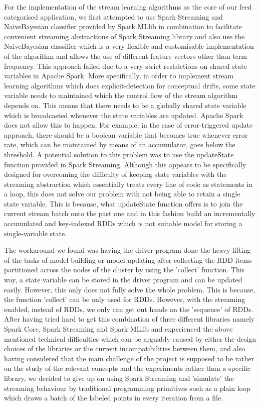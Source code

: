 \documentclass{article} %
\begin{document}
For the implementation of the stream learning algorithms as the core of our feed categorised application, we first attempted to use Spark Streaming and NaiveBayesian classifier provided by Spark MLlib in combination to facilitate convenient streaming abstractions of Spark Streaming library and also use the NaiveBayesian classifier which is a very flexible and customisable implementation of the algorithm and allows the use of different feature vectors other than term-frequency. This approach failed due to a very strict restrictions on shared state variables in Apache Spark. More specifically, in order to implement stream learning algorithms which does explicit-detection for conceptual drifts, some state variable needs to maintained which the control flow of the stream algorithm depends on. This means that there needs to be a globally shared state variable which is broadcasted whenever the state variables are updated. Apache Spark does not allow this to happen. For example, in the case of error-triggered update approach, there should be a boolean variable that becomes true whenever error rate, which can be maintained by means of an accumulator, goes below the threshold. A potential solution to this problem was to use the updateState function provided in Spark Streaming. Although this appears to be specifically designed for overcoming the difficulty of keeping state variables with the streaming abstraction which essentially treats every line of code as statements in a loop, this does not solve our problem with not being able to retain a single state variable. This is because, what updateState function offers is to join the current stream batch onto the past one and in this fashion build an incrementally accumulated and key-indexed RDDs which is not suitable model for storing a single-variable state. 
 
The workaround we found was having the driver program done the heavy lifting of the tasks of model building or model updating after collecting the RDD items partitioned across the nodes of the cluster by using the 'collect' function. This way, a state variable can be stored in the driver program and can be updated easily. However, this only does not fully solve the whole problem. This is because, the function 'collect' can be only used for RDDs. However, with the streaming enabled, instead of RDDs, we only can get out hands on the 'sequence' of RDDs. After having tried hard to get this combination of three different libraries namely Spark Core, Spark Streaming and Spark MLlib and experienced the above mentioned technical difficulties which can be arguably caused by either the design choices of the libraries or the current incompatibilities between them, and also having considered that the main challenge of the project is supposed to be rather on the study of the relevant concepts and the experiments rather than a specific library, we decided to give up on using Spark Streaming and 'simulate' the streaming behaviour by traditional programming primitives such as a plain loop which draws a batch of the labeled points in every iteration from a file.
\end{document}
